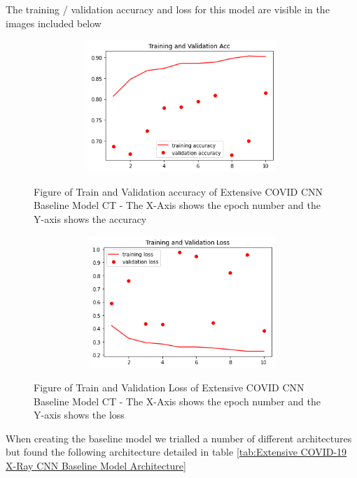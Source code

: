The training / validation accuracy and loss for this model are visible in the images included below
 \begin{figure}[H]
    \centering
    \includegraphics[width=1\textwidth,height=5cm,keepaspectratio]{Images/ExtensiveCNNBaselineModelExtensiveCovidAccCT.png}\\
    \caption{Figure of Train and Validation accuracy of Extensive COVID CNN Baseline Model CT  - The X-Axis shows the epoch number and the Y-axis shows the accuracy}
    \label{fig:Extensive COVID CT CNN Baseline Model CNN Baseline Train and Validation Accuracy}
\end{figure}
 \begin{figure}[H]
    \centering
\includegraphics[width=1\textwidth,height=5cm,keepaspectratio]{Images/ExtensiveCNNBaselineModelExtensiveCovidLossCT.png}\\
    \caption{Figure of Train and Validation Loss of Extensive COVID CNN Baseline Model CT  - The X-Axis shows the epoch number and the Y-axis shows the loss}
    \label{fig:Extensive COVID CT CNN Baseline Model CNN Baseline Train and Validation Loss}
\end{figure}
When creating the baseline model we trialled a number of different architectures but found the following architecture detailed in table \ref{tab:Extensive COVID-19 X-Ray CNN Baseline Model Architecture}
